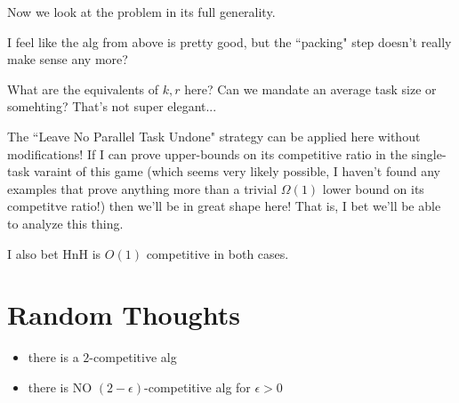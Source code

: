 \documentclass{article}[11pt]
\begin{document}
Now we look at the problem in its full generality.

I feel like the alg from above is pretty good, but the ``packing"
step doesn't really make sense any more?

What are the equivalents of $k, r$ here? Can we mandate an
average task size or somehting? That's not super elegant...

The ``Leave No Parallel Task Undone" strategy can be applied here without modifications!
If I can prove upper-bounds on its competitive ratio in the
single-task varaint of this game (which seems very likely
possible, I haven't found any examples that prove anything more
than a trivial $\Omega(1)$ lower bound on its competitve ratio!)
then we'll be in great shape here! That is, I bet we'll be able
to analyze this thing.

I also bet HnH is $O(1)$ competitive in both cases.

\section{Random Thoughts}

\begin{itemize}
  \item there is a $2$-competitive alg 
  \item there is NO $(2-\epsilon)$-competitive alg  for $\epsilon > 0$
\end{itemize}
\end{document}
